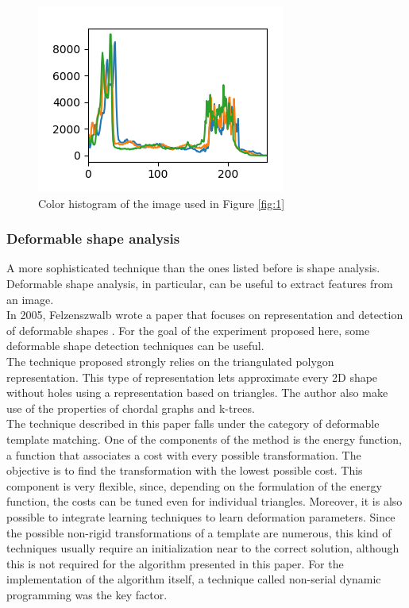 \documentclass[conference]{IEEEtran}
\begin{document}
				\begin{figure}[!ht]
					\centerline{\includegraphics[width=\linewidth]{imgs/obama_histogram.png}}
					\caption{Color histogram of the image used in Figure \ref{fig:1}}
					\label{fig:2}
				\end{figure}
				
				\subsubsection{Deformable shape analysis}
			
					A more sophisticated technique than the ones listed before is shape analysis. Deformable shape analysis, in particular, can be useful to extract features from an image.\\
					In 2005, Felzenszwalb wrote a paper that focuses on representation and detection of deformable shapes \cite{felzenszwalb2005representation}. For the goal of the experiment proposed here, some deformable shape 
					detection techniques can be useful. \\
					The technique proposed strongly relies on the triangulated polygon representation. This type of representation lets approximate every 2D shape without holes using a representation based on triangles. 
					The author also make use of the properties of chordal graphs and k-trees.\\
					The technique described in this paper falls under the category of deformable template matching. One of the components of the method is the energy function, a function that associates a cost with every 
					possible transformation. The objective is to find the transformation with the lowest possible cost. This component is very flexible, since, depending on the formulation of the energy function, the costs 
					can be tuned even for individual triangles. Moreover, it is also possible to integrate learning techniques to learn deformation parameters.
					Since the possible non-rigid transformations of a template are numerous, this kind of techniques usually require an initialization near to the correct solution, 
					although this is not required for the algorithm presented in this paper. For the implementation of the algorithm itself, a technique called non-serial dynamic programming was the key factor.
					
\end{document}
